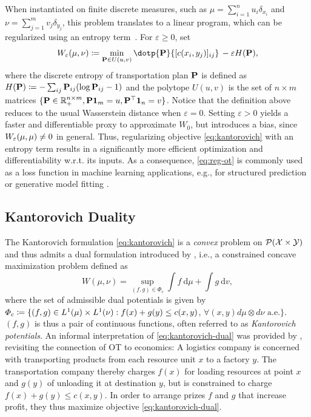 When instantiated on finite discrete measures, such as $\mu=\sum_{i=1}^n u_i\delta_{x_i}$ and $\nu=\sum_{j=1}^m v_j\delta_{y_j}$, this problem translates to a linear program, which can be regularized using an entropy term~\citep{cuturi2013sinkhorn,peyre2019computational}. For $\varepsilon\geq0$, set 
\begin{equation} \label{eq:reg-ot}
\We(\mu,\nu) \defeq \min_{\bP\in U(u, v)} \dotp{\bP}{[c(x_i, y_j)]_{ij}}  \,-\varepsilon H(\bP),
\end{equation}
where the discrete entropy of transportation plan $\mathbf{P}$ is defined as $H(\mathbf{P}) \coloneqq -\sum_{ij} \mathbf{P}_{ij} (\log \mathbf{P}_{ij} - 1)$ and the polytope $U(u, v)$ is the set of $n\times m$ matrices $\{\mathbf{P}\in\mathbb{R}^{n \times m}_+, \mathbf{P}\mathbf{1}_m =u, \mathbf{P}^\top\mathbf{1}_n=v\}$. 
Notice that the definition above reduces to the usual Wasserstein distance when $\varepsilon=0$. Setting $\varepsilon>0$ yields a faster and differentiable proxy to approximate $W_{0}$, but introduces a bias, since $W_{\varepsilon}(\mu,\mu)\ne 0$ in general.
Thus, regularizing objective \eqref{eq:kantorovich} with an entropy term results in a significantly more efficient optimization \citep{cuturi2013sinkhorn} and differentiability w.r.t. its inputs. As a consequence, \eqref{eq:reg-ot} is commonly used as a loss function in machine learning applications, e.g., for structured prediction \citep{frogner2015learning,janati2020multi} or generative model fitting \citep{arjovsky2017wasserstein, salimans2018improving, genevay2018learning}.


\subsection{Kantorovich Duality} \label{sec:background_dual}

The Kantorovich formulation \eqref{eq:kantorovich} is a \emph{convex} problem on ${\mathcal{P}}(\mathcal{X} \times \mathcal{Y})$ and thus admits a dual formulation introduced by \citet{kantorovich1942transfer}, i.e., a constrained concave maximization problem defined as
\begin{equation} \label{eq:kantorovich-dual}
    W(\mu, \nu)=\sup _{(f, g) \in \Phi_{c}} \int f \mathrm{~d} \mu+\int g \mathrm{~d} v,
\end{equation}
 where the set of admissible dual potentials is given by $\Phi_c \coloneqq \{(f, g) \in L^{1}(\mu) \times L^{1}(\nu): f(x)+g(y) \leq c(x,y)$, $\forall(x, y) d\mu \otimes d\nu \text{ a.e.}\}$.
$(f, g)$ is thus a pair of continuous functions, often referred to as \emph{Kantorovich potentials}.
An informal interpretation of \eqref{eq:kantorovich-dual} was provided by \citet{caffarelli2003monge}, revisiting the connection of \acrshort{OT} to economics: 
A logistics company is concerned with transporting products from each resource unit $x$ to a factory $y$. The transportation company thereby charges $f(x)$ for loading resources at point $x$ and $g(y)$ of unloading it at destination $y$, but is constrained to charge $f(x)+g(y) \le c(x,y)$. In order to arrange prizes $f$ and $g$ that increase profit, they thus maximize objective \eqref{eq:kantorovich-dual}.

